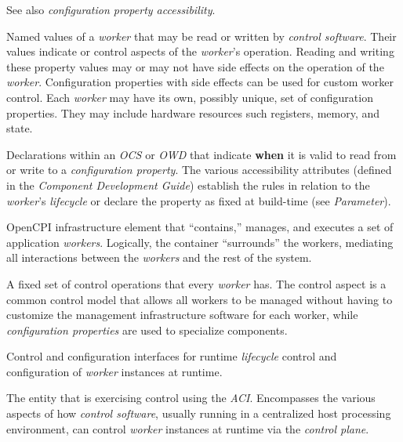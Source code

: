 \begin{description}[style=nextline]
\item[Configuration Properties]
\subitem See also \textit{configuration property accessibility}.

Named values of a \textit{worker} that may be read or written by \textit{control software}.
Their values indicate or control aspects of the \textit{worker}'s operation.
Reading and writing these property values may or may not have side effects on the operation of the \textit{worker}.
Configuration properties with side effects can be used for custom worker control.
Each \textit{worker} may have its own, possibly unique, set of configuration properties.
They may include hardware resources such registers, memory, and state.

\item[Configuration Property Accessibility]
Declarations within an \textit{OCS} or \textit{OWD} that indicate \textbf{when} it is valid to read from or write to a \textit{configuration property}.
The various accessibility attributes (defined in the \textit{Component Development Guide}) establish the rules in relation to the \textit{worker}'s \textit{lifecycle} or declare the property as fixed at build-time (see \textit{Parameter}).

\item[Containers]
OpenCPI infrastructure element that ``contains,'' manages, and executes a set of application \textit{workers}. Logically, the container ``surrounds'' the workers, mediating all interactions between the \textit{workers} and the rest of the system.

\item[Control Operations]
A fixed set of control operations that every \textit{worker} has. The control aspect is a common control model that allows all workers to be managed without having to customize the management infrastructure software for each worker, while \textit{configuration properties} are used to specialize components.

\item[Control Plane]
Control and configuration interfaces for runtime \textit{lifecycle} control and configuration of \textit{worker} instances at runtime.

\item[Control Software (AKA Control Application AKA Control Agent)]
The entity that is exercising control using the \textit{ACI}. Encompasses the various aspects of how \textit{control software}, usually running in a centralized host processing environment, can control \textit{worker} instances at runtime via the \textit{control plane}.


\end{description}
